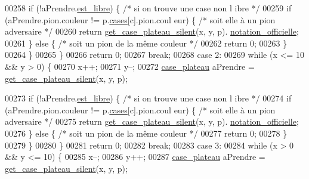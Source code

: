 \begin{DoxyCode}
00258                         \textcolor{keywordflow}{if} (!aPrendre.\hyperlink{structcase__plateau_a173f25d2fd7c653d77ca8174ba4f636d}{est_libre}) \{ \textcolor{comment}{/* si on trouve une case non l
      ibre */}
00259                                 \textcolor{keywordflow}{if} (aPrendre.pion.couleur != p.\hyperlink{structplateau_a6afaa60f594542e0d742b0c6d3223392}{cases}[c].pion.coul
      eur) \{ \textcolor{comment}{/* soit elle à un pion adversaire */}
00260                                         \textcolor{keywordflow}{return} \hyperlink{plateau_8h_a60a8f706865d0ae9087f8d65d4667655}{get_case_plateau_silent}(x, y, p).
      \hyperlink{structcase__plateau_ad510581b324604a9cf685cbb769a421a}{notation_officielle};
00261                                 \} \textcolor{keywordflow}{else} \{ \textcolor{comment}{/* soit un pion de la même couleur */}
00262                                         \textcolor{keywordflow}{return} 0;
00263                                 \}
00264                         \}
00265                 \}
00266                 \textcolor{keywordflow}{return} 0;
00267                 \textcolor{keywordflow}{break};
00268         \textcolor{keywordflow}{case} 2:
00269                 \textcolor{keywordflow}{while} (x <= 10 && y > 0) \{
00270                         x++;
00271                         y--;
00272                         \hyperlink{structcase__plateau}{case_plateau} aPrendre = \hyperlink{plateau_8h_a60a8f706865d0ae9087f8d65d4667655}{get_case_plateau_silent}(x, y, p);
      
00273                         \textcolor{keywordflow}{if} (!aPrendre.\hyperlink{structcase__plateau_a173f25d2fd7c653d77ca8174ba4f636d}{est_libre}) \{ \textcolor{comment}{/* si on trouve une case non l
      ibre */}
00274                                 \textcolor{keywordflow}{if} (aPrendre.pion.couleur != p.\hyperlink{structplateau_a6afaa60f594542e0d742b0c6d3223392}{cases}[c].pion.coul
      eur) \{ \textcolor{comment}{/* soit elle à un pion adversaire */}
00275                                         \textcolor{keywordflow}{return} \hyperlink{plateau_8h_a60a8f706865d0ae9087f8d65d4667655}{get_case_plateau_silent}(x, y, p).
      \hyperlink{structcase__plateau_ad510581b324604a9cf685cbb769a421a}{notation_officielle};
00276                                 \} \textcolor{keywordflow}{else} \{ \textcolor{comment}{/* soit un pion de la même couleur */}
00277                                         \textcolor{keywordflow}{return} 0;
00278                                 \}
00279                         \}
00280                 \}
00281                 \textcolor{keywordflow}{return} 0;
00282                 \textcolor{keywordflow}{break};
00283         \textcolor{keywordflow}{case} 3:
00284                 \textcolor{keywordflow}{while} (x > 0 && y <= 10) \{
00285                         x--;
00286                         y++;
00287                         \hyperlink{structcase__plateau}{case_plateau} aPrendre = \hyperlink{plateau_8h_a60a8f706865d0ae9087f8d65d4667655}{get_case_plateau_silent}(x, y, p);
      

\end{DoxyCode}
